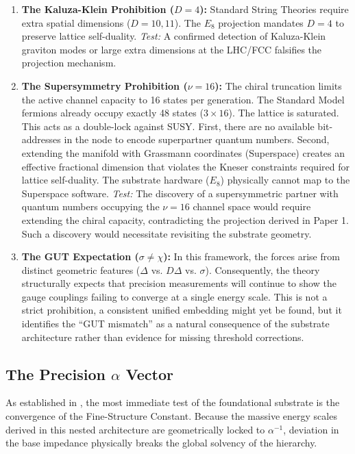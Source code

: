 \begin{enumerate}
    \item \textbf{The Kaluza-Klein Prohibition ($D=4$):} Standard String Theories require extra spatial dimensions ($D=10, 11$). The $E_8$ projection mandates $D=4$ to preserve lattice self-duality.
    \textit{Test:} A confirmed detection of Kaluza-Klein graviton modes or large extra dimensions at the LHC/FCC falsifies the projection mechanism.

    \item \textbf{The Supersymmetry Prohibition ($\nu=16$):}
    The chiral truncation limits the active channel capacity to 16 states per generation. The Standard Model fermions already occupy exactly 48 states ($3 \times 16$). The lattice is saturated. This acts as a double-lock against SUSY. First, there are no available bit-addresses in the node to encode superpartner quantum numbers. Second, extending the manifold with Grassmann coordinates (Superspace) creates an effective fractional dimension that violates the Kneser constraints required for lattice self-duality. The substrate hardware ($E_8$) physically cannot map to the Superspace software. \textit{Test:} The discovery of a supersymmetric partner with quantum numbers occupying the $\nu=16$ channel space would require extending the chiral capacity, contradicting the projection derived in Paper 1. Such a discovery would necessitate revisiting the substrate geometry.

    \item \textbf{The GUT Expectation ($\sigma \neq \chi$):} In this framework, the forces arise from distinct geometric features ($\Delta$ vs. $D\Delta$ vs. $\sigma$). Consequently, the theory structurally expects that precision measurements will continue to show the gauge couplings failing to converge at a single energy scale. This is not a strict prohibition, a consistent unified  embedding might yet be found, but it identifies the ``GUT mismatch'' as a natural consequence of the substrate architecture rather than evidence for missing threshold corrections.
\end{enumerate}

\subsection{The Precision \texorpdfstring{$\alpha$}{alpha} Vector}
As established in \cite{meyer_informational_2026}, the most immediate test of the foundational substrate is the convergence of the Fine-Structure Constant. Because the massive energy scales derived in this nested architecture are geometrically locked to $\alpha^{-1}$, deviation in the base impedance physically breaks the global solvency of the hierarchy.

